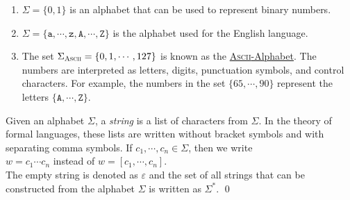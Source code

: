 \examplesEng
\begin{enumerate}
\item $\Sigma = \{ 0, 1\}$ is an alphabet that can be used to represent binary numbers.
\item $\Sigma = \{ \mathtt{a}, \cdots, \mathtt{z}, \mathtt{A}, \cdots, \mathtt{Z} \}$ 
      is the alphabet used for the English language.
\item The set $\Sigma_{\textsc{\scriptsize Ascii}} = \{ 0, 1, \cdots, 127 \}$ is known as the
      \href{http://en.wikipedia.org/wiki/ASCII}{\textsc{Ascii}-Alphabet}.  The numbers are
      interpreted as letters, digits, punctuation symbols, and control characters.
      For example, the numbers in the set $\{65, \cdots, 90 \}$ represent the letters
      $\{\mathtt{A}, \cdots, \mathtt{Z}\}$.  
      \eox
\end{enumerate}

\begin{Definition}[Strings]
Given an alphabet $\Sigma$, a \emph{string} is a list of characters from $\Sigma$.
In the theory of formal languages, these lists are written without bracket symbols and with
separating comma symbols.  If $c_1,\cdots,c_n \in \Sigma$, then we write 
\\[0.2cm]
\hspace*{1.3cm}
$w = c_1\cdots c_n$ \quad instead of \quad $w = [c_1,\cdots,c_n]$.
\\[0.2cm]
The empty string is denoted as $\varepsilon$ and  the set of all strings that can be constructed
from the alphabet $\Sigma$ is written as $\Sigma^*$.
\qed
\end{Definition}

